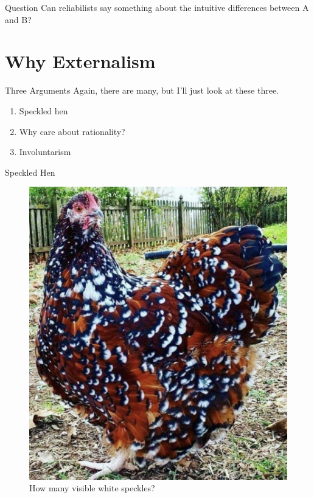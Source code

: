 \documentclass[
  17pt,
  letterpaper,
  ignorenonframetext,
  aspectratio=169,
  handout]{beamer}
\providecommand{\tightlist}{%
  \setlength{\itemsep}{0pt}\setlength{\parskip}{0pt}}\usepackage{longtable,booktabs,array}
\begin{document}
\begin{frame}{Question}
\protect\hypertarget{question-1}{}
Can reliabilists say something about the intuitive differences between A
and B?
\end{frame}

\hypertarget{why-externalism}{%
\section{Why Externalism}\label{why-externalism}}

\begin{frame}{Three Arguments}
\protect\hypertarget{three-arguments}{}
Again, there are many, but I'll just look at these three.

\begin{enumerate}[<+->]
\tightlist
\item
  Speckled hen
\item
  Why care about rationality?
\item
  Involuntarism
\end{enumerate}
\end{frame}

\begin{frame}{Speckled Hen}
\protect\hypertarget{speckled-hen}{}
\begin{figure}

{\centering \includegraphics[width=\textwidth,height=0.6\textheight]{../images/hen.jpg}

}

\caption{How many visible white speckles?}

\end{figure}
\end{frame}
\end{document}
